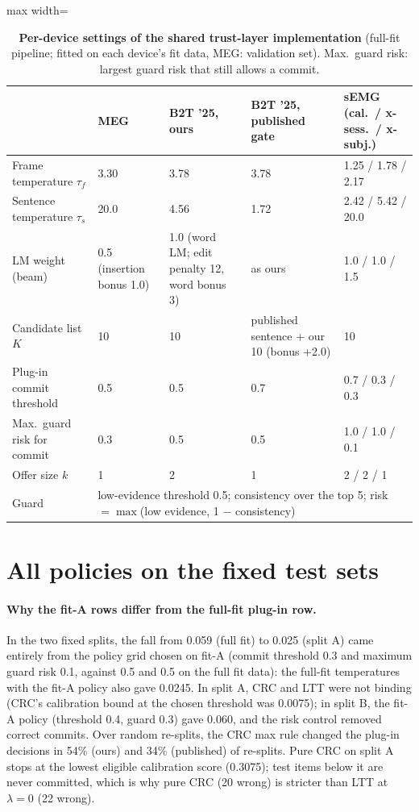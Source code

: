 \begin{table}[H]
  \centering
  \caption{\textbf{Per-device settings of the shared trust-layer implementation} (full-fit pipeline; fitted on each device's fit data, MEG: validation set). Max.\ guard risk: largest guard risk that still allows a commit.}
  \label{tab:settings}
  \small
  \begin{adjustbox}{max width=\linewidth}\begin{tabular}{@{}lllll@{}}
    \toprule
    & \textbf{MEG} & \textbf{B2T '25, ours} & \textbf{B2T '25, published gate} & \textbf{sEMG (cal.\ / x-sess.\ / x-subj.)} \\
    \midrule
    Frame temperature $\tau_f$ & 3.30 & 3.78 & 3.78 & 1.25 / 1.78 / 2.17 \\
    Sentence temperature $\tau_s$ & 20.0 & 4.56 & 1.72 & 2.42 / 5.42 / 20.0 \\
    LM weight (beam) & 0.5 (insertion bonus 1.0) & 1.0 (word LM; edit penalty 12, word bonus 3) & as ours & 1.0 / 1.0 / 1.5 \\
    Candidate list $K$ & 10 & 10 & published sentence + our 10 (bonus +2.0) & 10 \\
    Plug-in commit threshold & 0.5 & 0.5 & 0.7 & 0.7 / 0.3 / 0.3 \\
    Max.\ guard risk for commit & 0.3 & 0.5 & 0.5 & 1.0 / 1.0 / 0.1 \\
    Offer size $k$ & 1 & 2 & 1 & 2 / 2 / 1 \\
    Guard & \multicolumn{4}{l}{low-evidence threshold 0.5; consistency over the top 5; risk $=\max$(low evidence, 1 $-$ consistency)} \\
    \bottomrule
  \end{tabular}\end{adjustbox}
\end{table}

\section{All policies on the fixed test sets}
\label{app:full}

\paragraph{Why the fit-A rows differ from the full-fit plug-in row.} In the two fixed splits, the fall from 0.059 (full fit) to 0.025 (split A) came entirely from the policy grid chosen on fit-A (commit threshold 0.3 and maximum guard risk 0.1, against 0.5 and 0.5 on the full fit data): the full-fit temperatures with the fit-A policy also gave 0.0245. In split A, CRC and LTT were not binding (CRC's calibration bound at the chosen threshold was 0.0075); in split B, the fit-A policy (threshold 0.4, guard 0.3) gave 0.060, and the risk control removed correct commits. Over random re-splits, the CRC max rule changed the plug-in decisions in 54\% (ours) and 34\% (published) of re-splits. Pure CRC on split A stops at the lowest eligible calibration score (0.3075); test items below it are never committed, which is why pure CRC (20 wrong) is stricter than LTT at $\lambda = 0$ (22 wrong).

